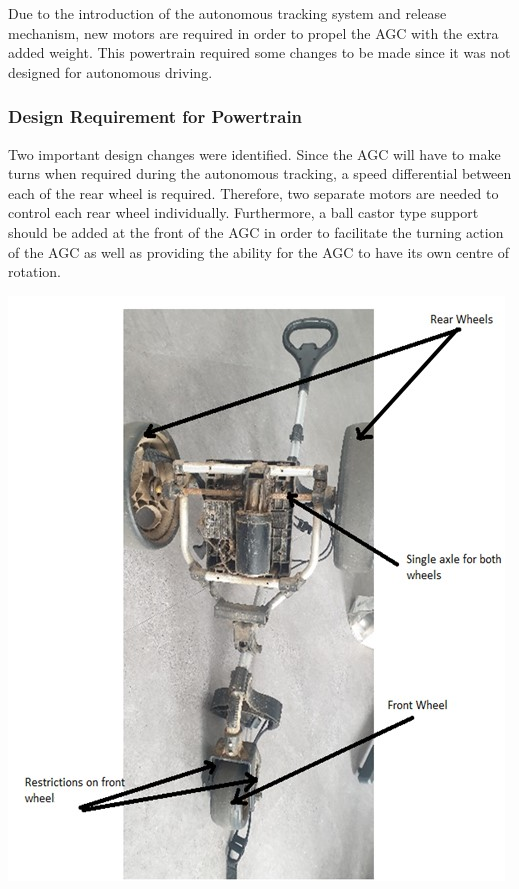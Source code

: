 \documentclass[11pt,landscape]{article}
\newenvironment{Figure}
  {\par\medskip\noindent\minipage{\linewidth}}
  {\endminipage\par\medskip}
\begin{document}
\begin{multicols}{2}
Due to the introduction of the autonomous tracking system and release
mechanism, new motors are required in order to propel the AGC with the
extra added weight. This powertrain required some changes to be made since
it was not designed for autonomous driving.

\subsubsection{Design Requirement for Powertrain}
Two important design changes were identified. Since the AGC will have to
make turns when required during the autonomous tracking, a speed
differential between each of the rear wheel is required. Therefore, two
separate motors are needed to control each rear wheel individually.
Furthermore, a ball castor type support should be added at the front of the
AGC in order to facilitate the turning action of the AGC as well as
providing the ability for the AGC to have its own centre of rotation. 
    

\begin{Figure}
    \begin{center}
        \includegraphics[width=\textwidth]{Figure25.jpg}
        \label{fig:train}
    \end{center}
\end{Figure}
\newpage

\end{multicols}
\end{document}
